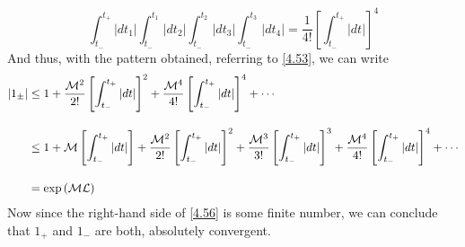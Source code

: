 \documentclass[12pt,a4paper]{article}
\begin{document}
	\begin{equation}
		\int_{t_{-}}^{t_{+}} \left| dt_{1} \right| \int_{t_{-}}^{t_{1}} \left| dt_{2} \right| \int_{t_{-}}^{t_{2}} \left| dt_{3} \right| \int_{t_{-}}^{t_{3}} \left| dt_{4} \right| = \dfrac{1}{4!} \left[ \int_{t_{-}}^{t_{+}} \left| dt \right| \right]^{4}
	\end{equation}
	And thus, with the pattern obtained, referring to \eqref{4.53}, we can write
	\begin{align}
		\left| 1_{\pm} \right| &\leq 1 + \dfrac{\mathcal{M}^{2}}{2!} \left[ \int_{t_{-}}^{t_{+}} \left| dt \right| \right]^{2} + \dfrac{\mathcal{M}^{4}}{4!} \left[ \int_{t_{-}}^{t_{+}} \left| dt \right| \right]^{4} + \cdots \notag \\[10pt]
		&\leq 1 + \mathcal{M} \left[ \int_{t_{-}}^{t_{+}} \left| dt \right| \right] + \dfrac{\mathcal{M}^{2}}{2!} \left[ \int_{t_{-}}^{t_{+}} \left| dt \right| \right]^{2} + \dfrac{\mathcal{M}^{3}}{3!} \left[ \int_{t_{-}}^{t_{+}} \left| dt \right| \right]^{3} + \dfrac{\mathcal{M}^{4}}{4!} \left[ \int_{t_{-}}^{t_{+}} \left| dt \right| \right]^{4} + \cdots \notag \\[10pt]
		&= \exp\left( \mathcal{M} \mathcal{L} \right) \label{4.56}
	\end{align}
	Now since the right-hand side of \eqref{4.56} is some finite number, we can conclude that $1_{+}$ and $1_{-}$ are both, absolutely convergent.
	
\end{document}
